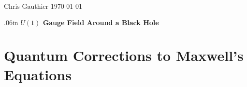 \documentclass[12pt]{article}
\begin{document}
\begin{flushright}
Chris Gauthier
\today
\end{flushright}
\begin{center} 
\vglue .06in
{\Large \bf {$U(1)$ Gauge Field Around a Black Hole}}\\[.5in]

\end{center}
\section{Quantum Corrections to Maxwell's Equations}
\end{document}
